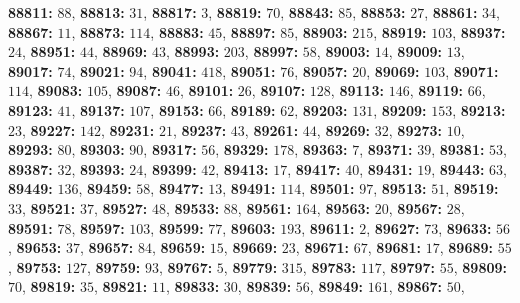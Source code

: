 \textsf{\bfseries 88811:} $88$, \textsf{\bfseries 88813:} $31$, \textsf{\bfseries 88817:} $3$, \textsf{\bfseries 88819:} $70$, \textsf{\bfseries 88843:} $85$, \textsf{\bfseries 88853:} $27$, \textsf{\bfseries 88861:} $34$, \textsf{\bfseries 88867:} $11$, \textsf{\bfseries 88873:} $114$, \textsf{\bfseries 88883:} $45$, \textsf{\bfseries 88897:} $85$, \textsf{\bfseries 88903:} $215$, \textsf{\bfseries 88919:} $103$, \textsf{\bfseries 88937:} $24$, \textsf{\bfseries 88951:} $44$, \textsf{\bfseries 88969:} $43$, \textsf{\bfseries 88993:} $203$, \textsf{\bfseries 88997:} $58$, \textsf{\bfseries 89003:} $14$, \textsf{\bfseries 89009:} $13$, \textsf{\bfseries 89017:} $74$, \textsf{\bfseries 89021:} $94$, \textsf{\bfseries 89041:} $418$, \textsf{\bfseries 89051:} $76$, \textsf{\bfseries 89057:} $20$, \textsf{\bfseries 89069:} $103$, \textsf{\bfseries 89071:} $114$, \textsf{\bfseries 89083:} $105$, \textsf{\bfseries 89087:} $46$, \textsf{\bfseries 89101:} $26$, \textsf{\bfseries 89107:} $128$, \textsf{\bfseries 89113:} $146$, \textsf{\bfseries 89119:} $66$, \textsf{\bfseries 89123:} $41$, \textsf{\bfseries 89137:} $107$, \textsf{\bfseries 89153:} $66$, \textsf{\bfseries 89189:} $62$, \textsf{\bfseries 89203:} $131$, \textsf{\bfseries 89209:} $153$, \textsf{\bfseries 89213:} $23$, \textsf{\bfseries 89227:} $142$, \textsf{\bfseries 89231:} $21$, \textsf{\bfseries 89237:} $43$, \textsf{\bfseries 89261:} $44$, \textsf{\bfseries 89269:} $32$, \textsf{\bfseries 89273:} $10$, \textsf{\bfseries 89293:} $80$, \textsf{\bfseries 89303:} $90$, \textsf{\bfseries 89317:} $56$, \textsf{\bfseries 89329:} $178$, \textsf{\bfseries 89363:} $7$, \textsf{\bfseries 89371:} $39$, \textsf{\bfseries 89381:} $53$, \textsf{\bfseries 89387:} $32$, \textsf{\bfseries 89393:} $24$, \textsf{\bfseries 89399:} $42$, \textsf{\bfseries 89413:} $17$, \textsf{\bfseries 89417:} $40$, \textsf{\bfseries 89431:} $19$, \textsf{\bfseries 89443:} $63$, \textsf{\bfseries 89449:} $136$, \textsf{\bfseries 89459:} $58$, \textsf{\bfseries 89477:} $13$, \textsf{\bfseries 89491:} $114$, \textsf{\bfseries 89501:} $97$, \textsf{\bfseries 89513:} $51$, \textsf{\bfseries 89519:} $33$, \textsf{\bfseries 89521:} $37$, \textsf{\bfseries 89527:} $48$, \textsf{\bfseries 89533:} $88$, \textsf{\bfseries 89561:} $164$, \textsf{\bfseries 89563:} $20$, \textsf{\bfseries 89567:} $28$, \textsf{\bfseries 89591:} $78$, \textsf{\bfseries 89597:} $103$, \textsf{\bfseries 89599:} $77$, \textsf{\bfseries 89603:} $193$, \textsf{\bfseries 89611:} $2$, \textsf{\bfseries 89627:} $73$, \textsf{\bfseries 89633:} $56$, \textsf{\bfseries 89653:} $37$, \textsf{\bfseries 89657:} $84$, \textsf{\bfseries 89659:} $15$, \textsf{\bfseries 89669:} $23$, \textsf{\bfseries 89671:} $67$, \textsf{\bfseries 89681:} $17$, \textsf{\bfseries 89689:} $55$, \textsf{\bfseries 89753:} $127$, \textsf{\bfseries 89759:} $93$, \textsf{\bfseries 89767:} $5$, \textsf{\bfseries 89779:} $315$, \textsf{\bfseries 89783:} $117$, \textsf{\bfseries 89797:} $55$, \textsf{\bfseries 89809:} $70$, \textsf{\bfseries 89819:} $35$, \textsf{\bfseries 89821:} $11$, \textsf{\bfseries 89833:} $30$, \textsf{\bfseries 89839:} $56$, \textsf{\bfseries 89849:} $161$, \textsf{\bfseries 89867:} $50$, 

